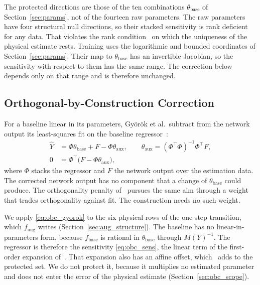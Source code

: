 The protected directions are those of the ten combinations
$\theta_{\mathrm{base}}$ of Section~\ref{sec:params}, not of the fourteen raw
parameters.
The raw parameters have four structural null directions, so their stacked
sensitivity is rank deficient for any data.
That violates the rank condition~\cite[Assumption~1]{gyorok2026obc} on which
the uniqueness of the physical estimate rests.
Training uses the logarithmic and bounded coordinates of
Section~\ref{sec:params}.
Their map to $\theta_{\mathrm{base}}$ has an invertible Jacobian, so the
sensitivity with respect to them has the same range.
The correction below depends only on that range and is therefore unchanged.

\subsection{Orthogonal-by-Construction Correction}\label{sec:obc_map}
For a baseline linear in its parameters, Gy\"or\"ok et al.\ subtract from the
network output its least-squares fit on the baseline
regressor~\cite[Eqs.~(8), (9), Lemma~3]{gyorok2026obc}:
\begin{equation}
\begin{aligned}
 \hat Y&=\Phi\theta_{\mathrm{base}}+F-\Phi\theta_{\mathrm{aux}},\qquad
 \theta_{\mathrm{aux}}=(\Phi^\top\Phi)^{-1}\Phi^\top F,\\
 0&=\Phi^\top\bigl(F-\Phi\theta_{\mathrm{aux}}\bigr),
\end{aligned}
\label{eq:obc_gyorok}
\end{equation}
where $\Phi$ stacks the regressor and $F$ the network output over the
estimation data.
The corrected network output has no component that a change of
$\theta_{\mathrm{base}}$ could produce.
The orthogonality penalty of~\cite{gyorok2025l4dc} pursues the same aim
through a weight that trades orthogonality against fit.
The construction needs no such weight.

We apply \eqref{eq:obc_gyorok} to the six physical rows of the one-step
transition, which $f_{\mathrm{aug}}$ writes (Section~\ref{sec:aug_structure}).
The baseline has no linear-in-parameters form, because $f_{\mathrm{base}}$ is
rational in $\theta_{\mathrm{base}}$ through $M(Y)^{-1}$.
The regressor is therefore the sensitivity \eqref{eq:obc_sens}, the linear
term of the first-order expansion of~\cite[Eq.~(15)]{gyorok2025l4dc}.
That expansion also has an affine offset, which~\cite[Eq.~(18)]{gyorok2025l4dc}
adds to the protected set.
We do not protect it, because it multiplies no estimated parameter and does
not enter the error of the physical estimate (Section~\ref{sec:obc_scope}).

